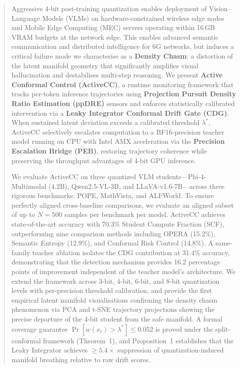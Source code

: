 \documentclass{ieeetmlcn}
\begin{document}
\begin{abstract}
Aggressive 4-bit post-training quantization enables deployment of
Vision--Language Models (VLMs) on hardware-constrained wireless edge nodes and Mobile Edge Computing (MEC) servers
operating within 16\,GB VRAM budgets at the network edge. This enables advanced semantic communication and distributed intelligence for 6G networks, but induces a critical failure mode we characterise as a
\textbf{Density Chasm}: a distortion of the latent manifold geometry
that significantly amplifies visual hallucination and
destabilises multi-step reasoning. We present \textbf{Active Conformal
Control (ActiveCC)}, a runtime monitoring framework that tracks
per-token inference trajectories using \textbf{Projection Pursuit
Density Ratio Estimation (ppDRE)} sensors and enforces statistically
calibrated intervention via a \textbf{Leaky Integrator Conformal Drift
Gate (CDG)}. When sustained latent deviation exceeds a calibrated
threshold $\lambda^*$, ActiveCC selectively escalates computation to a
BF16-precision teacher model running on CPU with Intel AMX acceleration
via the \textbf{Precision Escalation Bridge (PEB)}, restoring trajectory
coherence while preserving the throughput advantages of 4-bit GPU
inference.

We evaluate ActiveCC on three quantized VLM students---Phi-4-Multimodal
(4.2B), Qwen2.5-VL-3B, and LLaVA-v1.6-7B---across three rigorous benchmarks:
POPE, MathVista, and ALFWorld. To ensure perfectly aligned cross-baseline comparisons, we evaluate an aligned subset of up to $N=500$ samples per benchmark per model. ActiveCC achieves state-of-the-art accuracy
with 70.3\% Student Compute Fraction (SCF), outperforming nine
comparison methods including OPERA (15.2\%), Semantic Entropy (12.9\%),
and Conformal Risk Control (14.8\%). A same-family teacher ablation
isolates the CDG contribution at 31.4\% accuracy, demonstrating that the
detection mechanism provides 16.2 percentage points of improvement
independent of the teacher model's architecture. We extend the framework across 3-bit, 4-bit, 6-bit, and 8-bit quantization levels with per-precision threshold calibration, and provide the first empirical latent manifold visualisations confirming the density chasm phenomenon via PCA and t-SNE trajectory projections showing the precise departure of the 4-bit student from the safe manifold. A formal coverage guarantee $\Pr[w(x_t)>\lambda^*]\leq 0.052$ is proved under the split-conformal framework (Theorem~1), and Proposition~1 establishes that the Leaky Integrator achieves $\geq 5.4\times$ suppression of quantization-induced manifold breathing relative to raw drift scores.
\end{abstract}
\end{document}
